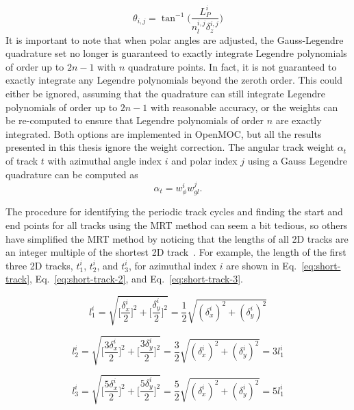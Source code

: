 \begin{equation}
\theta_{i,j} = \tan^{-1} \bigg( \frac{L_P^i}{n_l^{i,j} \delta_z^{i,j}}\bigg)
\label{eq:MRT-theta-correct}
\end{equation}
It is important to note that when polar angles are adjusted, the Gauss-Legendre quadrature set no longer is guaranteed to exactly integrate Legendre polynomials of order up to $2n-1$ with $n$ quadrature points. In fact, it is not guaranteed to exactly integrate any Legendre polynomials beyond the zeroth order. This could either be ignored, assuming that the quadrature can still integrate Legendre polynomials of order up to $2n-1$ with reasonable accuracy, or the weights can be re-computed to ensure that Legendre polynomials of order $n$ are exactly integrated. Both options are implemented in OpenMOC, but all the results presented in this thesis ignore the weight correction. The angular track weight $\alpha_t$ of track $t$ with azimuthal angle index $i$ and polar index $j$ using a Gauss Legendre quadrature can be computed as
\begin{equation}
\alpha_t = w_{\phi}^i w_{\textit{gl}}^j .
\end{equation}

The procedure for identifying the periodic track cycles and finding the start and end points for all tracks using the \ac{MRT} method can seem a bit tedious, so others have simplified the \ac{MRT} method by noticing that the lengths of all 2D tracks are an integer multiple of the shortest 2D track~\cite{kochunas}. For example, the length of the first three 2D tracks, $t_1^i$, $t_2^i$, and $t_3^i$, for azimuthal index $i$ are shown in Eq.~\ref{eq:short-track}, Eq.~\ref{eq:short-track-2}, and Eq.~\ref{eq:short-track-3}.

\begin{equation}
l_1^i = \sqrt{\bigg[\frac{\delta_x^i}{2}\bigg]^2 + \bigg[\frac{\delta_y^i}{2}\bigg]^2} = \frac{1}{2} \sqrt{(\delta_x^i)^2 + (\delta_y^i)^2}
\label{eq:short-track}
\end{equation}

\begin{equation}
l_2^i = \sqrt{\bigg[\frac{3 \delta_x^i}{2}\bigg]^2 + \bigg[\frac{3 \delta_y^i}{2}\bigg]^2} = \frac{3}{2} \sqrt{(\delta_x^i)^2 + (\delta_y^i)^2} = 3 l_1^i
\label{eq:short-track-2}
\end{equation}

\begin{equation}
l_3^i = \sqrt{\bigg[\frac{5 \delta_x^i}{2}\bigg]^2 + \bigg[\frac{5 \delta_y^i}{2}\bigg]^2} = \frac{5}{2} \sqrt{(\delta_x^i)^2 + (\delta_y^i)^2} = 5 l_1^i
\label{eq:short-track-3}
\end{equation}

